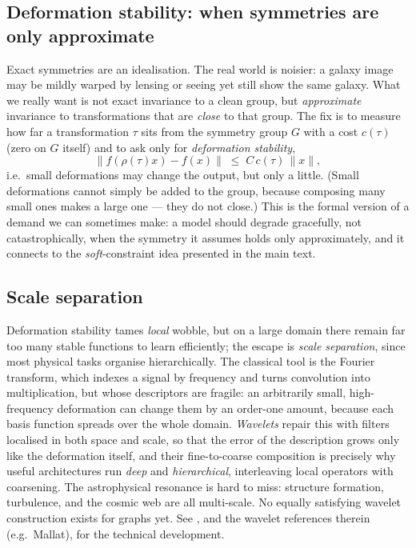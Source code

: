 \subsection*{Deformation stability: when symmetries are only approximate}
\label{app:sym:deformation}

Exact symmetries are an idealisation. The real world is noisier: a galaxy image may be mildly warped by lensing or seeing yet still show the same galaxy. What we really want is not exact invariance to a clean group, but \emph{approximate} invariance to transformations that are \emph{close} to that group. The fix is to measure how far a transformation $\tau$ sits from the symmetry group $G$ with a cost $c(\tau)$ (zero on $G$ itself) and to ask only for \emph{deformation stability},
%
\begin{equation}
\| f(\rho(\tau)x) - f(x)\| \;\le\; C\,c(\tau)\,\|x\|,
\label{eq:def-stability}
\end{equation}
%
i.e.\ small deformations may change the output, but only a little. (Small deformations cannot simply be added to the group, because composing many small ones makes a large one --- they do not close.) This is the formal version of a demand we can sometimes make: a model should degrade gracefully, not catastrophically, when the symmetry it assumes holds only approximately, and it connects to the \emph{soft}-constraint idea presented in the main text.

\subsection*{Scale separation}
\label{app:sym:scale}

Deformation stability tames \emph{local} wobble, but on a large domain there remain far too many stable functions to learn efficiently; the escape is \emph{scale separation}, since most physical tasks organise hierarchically. The classical tool is the Fourier transform, which indexes a signal by frequency and turns convolution into multiplication, but whose descriptors are fragile: an arbitrarily small, high-frequency deformation can change them by an order-one amount, because each basis function spreads over the whole domain. \emph{Wavelets} repair this with filters localised in both space and scale, so that the error of the description grows only like the deformation itself, and their fine-to-coarse composition is precisely why useful architectures run \emph{deep} and \emph{hierarchical}, interleaving local operators with coarsening. The astrophysical resonance is hard to miss: structure formation, turbulence, and the cosmic web are all multi-scale. No equally satisfying wavelet construction exists for graphs yet. See \citet{Bronstein2021_geometricDL_book}, and the wavelet references therein (e.g.\ Mallat), for the technical development.

